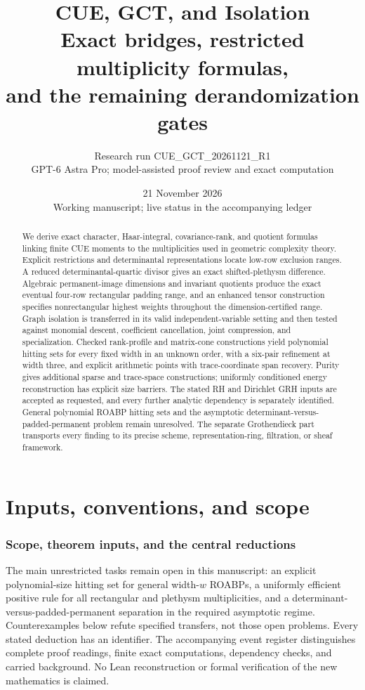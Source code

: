 \documentclass[11pt,a4paper]{article}
\title{CUE, GCT, and Isolation\\Exact bridges, restricted multiplicity formulas,\\and the remaining derandomization gates}
\author{Research run CUE\_GCT\_20261121\_R1\\GPT-6 Astra Pro; model-assisted proof review and exact computation}
\date{21 November 2026\\Working manuscript; live status in the accompanying ledger}
\theoremstyle{definition}\newtheorem{definition}{Definition}
\begin{document}
\maketitle
\begin{abstract}
We derive exact character, Haar-integral, covariance-rank, and quotient formulas linking finite CUE moments to the multiplicities used in geometric complexity theory. Explicit restrictions and determinantal representations locate low-row exclusion ranges. A reduced determinantal-quartic divisor gives an exact shifted-plethysm difference. Algebraic permanent-image dimensions and invariant quotients produce the exact eventual four-row rectangular padding range, and an enhanced tensor construction specifies nonrectangular highest weights throughout the dimension-certified range. Graph isolation is transferred in its valid independent-variable setting and then tested against monomial descent, coefficient cancellation, joint compression, and specialization. Checked rank-profile and matrix-cone constructions yield polynomial hitting sets for every fixed width in an unknown order, with a six-pair refinement at width three, and explicit arithmetic points with trace-coordinate span recovery. Purity gives additional sparse and trace-space constructions; uniformly conditioned energy reconstruction has explicit size barriers. The stated RH and Dirichlet GRH inputs are accepted as requested, and every further analytic dependency is separately identified. General polynomial ROABP hitting sets and the asymptotic determinant-versus-padded-permanent problem remain unresolved. The separate Grothendieck part transports every finding to its precise scheme, representation-ring, filtration, or sheaf framework.
\end{abstract}
\tableofcontents\clearpage
\part{Inputs, conventions, and scope}
\section{Scope, theorem inputs, and the central reductions}

The main unrestricted tasks remain open in this manuscript: an explicit polynomial-size hitting set for general width-$w$ ROABPs, a uniformly efficient positive rule for all rectangular and plethysm multiplicities, and a determinant-versus-padded-permanent separation in the required asymptotic regime. Counterexamples below refute specified transfers, not those open problems. Every stated deduction has an identifier. The accompanying event register distinguishes complete proof readings, finite exact computations, dependency checks, and carried background. No Lean reconstruction or formal verification of the new mathematics is claimed.
\end{document}
